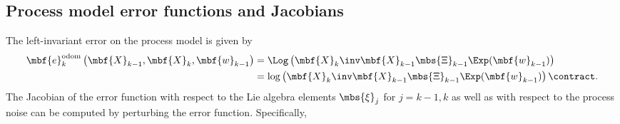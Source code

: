 \documentclass[ nobib, nofonts, notoc]{tufte-handout}
\begin{document}
    \subsection{Process model error functions and Jacobians}
    The left-invariant error on the process model is given by
    \begin{align}
        \mbf{e}^{\mathrm{odom}}_{k}\left( 
            \mbf{X}_{k-1},
            \mbf{X}_{k},
            \mbf{w}_{k-1}
        \right) 
        &= 
        \Log
        \left( 
            \mbf{X}_{k}\inv                
            \mbf{X}_{k-1}
            \mbs{\Xi}_{k-1}
            \Exp(\mbf{w}_{k-1})
        \right)\\
        &= 
        \log
        \left( 
            \mbf{X}_{k}\inv
            \mbf{X}_{k-1}
            \mbs{\Xi}_{k-1}
            \Exp(\mbf{w}_{k-1})
        \right)
            \contract.
    \end{align}
    The Jacobian of the error function with respect to the Lie algebra elements $\mbs{\xi}_{j}$ for $j=k - 1, k$ as well as with respect to the process noise can be computed by perturbing the error function. 
    Specifically,
\end{document}
